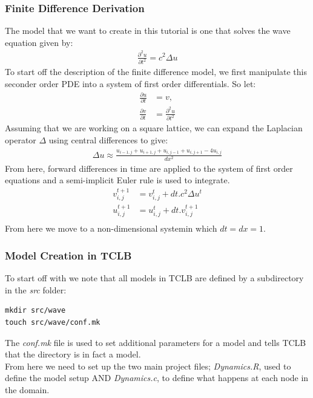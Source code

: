 \documentclass[12pt,a4paper]{report}
\begin{document}
\subsubsection{Finite Difference Derivation}
The model that we want to create in this tutorial is one that solves the wave equation given by:
\begin{align*}
\frac{\partial^2 u}{\partial t^2} = c^2 \Delta u
\end{align*}
To start off the description of the finite difference model, we first manipulate this seconder order PDE into a system of first order differentials. So let:
\begin{align*}
\frac{\partial u}{\partial t} &= v, \\
\frac{\partial v}{\partial t} &= \frac{\partial^2 u}{\partial t^2}
\end{align*}
Assuming that we are working on a square lattice, we can expand the Laplacian operator $\Delta$ using central differences to give:
\begin{align*}
\Delta u \approx \frac{u_{i-1,j}+u_{i+1,j}+u_{i,j-1}+u_{i,j+1}-4u_{i,j}}{dx^2}
\end{align*}
From here, forward differences in time are applied to the system of first order equations and a semi-implicit Euler rule is used to integrate.
\begin{align*}
v_{i,j}^{t+1} &= v_{i,j}^t + dt.c^2\Delta u^t \\
u_{i,j}^{t+1} &= u_{i,j}^t + dt.v_{i,j}^{t+1}\\
\end{align*}
From here we move to a non-dimensional systemin which $dt=dx=1$.
\subsubsection{Model Creation in TCLB}
To start off with we note that all models in TCLB are defined by a subdirectory in the \textit{src} folder:
\begin{lstlisting}
mkdir src/wave
touch src/wave/conf.mk
\end{lstlisting}
The \textit{conf.mk} file is used to set additional parameters for a model and tells TCLB that the directory is in fact a model. \\

From here we need to set up the two main project files; \textit{Dynamics.R}, used to define the model setup AND \textit{Dynamics.c}, to define what happens at each node in the domain.\\
\end{document}
